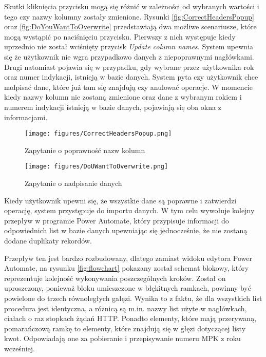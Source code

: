 Skutki kliknięcia przycisku mogą się różnić w zależności od wybranych wartości i tego czy nazwy kolumny zostały zmienione. Rysunki \ref{fig:CorrectHeadersPopup} oraz \ref{fig:DoYouWantToOverwrite} przedstawiają dwa możliwe scenariusze, które mogą wystąpić po naciśnięciu przycisku. Pierwszy z nich występuje kiedy uprzednio nie został wciśnięty przycisk \emph{Update column names}. System upewnia się że użytkownik nie wgra przypadkowo danych z niepoprawnymi nagłówkami. Drugi natomiast pojawia się w przypadku, gdy wybrane przez użytkownika rok oraz numer indykacji, istnieją w bazie danych. System pyta czy użytkownik chce nadpisać dane, które już tam się znajdują czy anulować operacje. W momencie kiedy nazwy kolumn nie zostaną zmienione oraz dane z wybranym rokiem i numerem indykacji istnieją w bazie danych, pojawiają się oba okna z informacjami.

\begin{figure}[htbp]
    \centering
    \begin{minipage}{0.48\textwidth}
        \centering
        \texttt{[image: figures/CorrectHeadersPopup.png]}
        \caption{Zapytanie o poprawność nazw kolumn}
        \label{fig:CorrectHeadersPopup}
    \end{minipage}\hfill
    \begin{minipage}{0.48\textwidth}
        \centering
        \texttt{[image: figures/DoUWantToOverwrite.png]}
        \caption{Zapytanie o nadpisanie danych}
        \label{fig:DoYouWantToOverwrite}
    \end{minipage}
    \label{fig:obrazki}
\end{figure}

Kiedy użytkownik upewni się, że wszystkie dane są poprawne i zatwierdzi operację, system przystępuje do importu danych. W tym celu wywołuje kolejny przepływ w programie Power Automate, który przypisuje informacji do odpowiednich list w bazie danych upewniając się jednocześnie, że nie zostaną dodane duplikaty rekordów. 

\noindent Przepływ ten jest bardzo rozbudowany, dlatego zamiast widoku edytora Power Automate, na rysunku \ref{fig:flowchart} pokazany został schemat blokowy, który reprezentuje kolejność wykonywania poszczególnych kroków. Został on uproszczony, ponieważ bloku umieszczone w błękitnych ramkach, powinny być powielone do trzech równoległych gałęzi. Wynika to z faktu, że dla wszystkich list procedura jest identyczna, a różnicą są m.in. nazwy list użyte w nagłówkach, ciałach o raz stopkach żądań HTTP. Ponadto elementy, które mają przerywaną, pomarańczową ramkę to elementy, które znajdują się w głęzi dotyczącej listy kwot. Odpowiadają one za pobieranie i przepisywanie numeru MPK z roku wcześniej.



